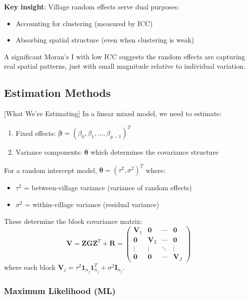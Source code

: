 \documentclass{article}
\begin{document}
\textbf{Key insight}: Village random effects serve dual purposes:
\begin{itemize}
    \item Accounting for clustering (measured by ICC)
    \item Absorbing spatial structure (even when clustering is weak)
\end{itemize}

A significant Moran's I with low ICC suggests the random effects are capturing real spatial patterns, just with small magnitude relative to individual variation.

\subsection{Estimation Methods}

[What We're Estimating]
In a linear mixed model, we need to estimate:
\begin{enumerate}
    \item Fixed effects: $\boldsymbol{\beta} = (\beta_0, \beta_1, \ldots, \beta_{p-1})^T$
    \item Variance components: $\boldsymbol{\theta}$ which determines the covariance structure
\end{enumerate}

For a random intercept model, $\boldsymbol{\theta} = (\tau^2, \sigma^2)^T$ where:
\begin{itemize}
    \item $\tau^2$ = between-village variance (variance of random effects)
    \item $\sigma^2$ = within-village variance (residual variance)
\end{itemize}

These determine the block covariance matrix:
\begin{equation}
\mathbf{V} = \mathbf{ZGZ}^T + \mathbf{R} = \begin{pmatrix}
\mathbf{V}_1 & \mathbf{0} & \cdots & \mathbf{0} \\
\mathbf{0} & \mathbf{V}_2 & \cdots & \mathbf{0} \\
\vdots & \vdots & \ddots & \vdots \\
\mathbf{0} & \mathbf{0} & \cdots & \mathbf{V}_J
\end{pmatrix}
\end{equation}
where each block $\mathbf{V}_j = \tau^2 \mathbf{1}_{n_j}\mathbf{1}_{n_j}^T + \sigma^2\mathbf{I}_{n_j}$.


\subsubsection{Maximum Likelihood (ML)}
\end{document}

